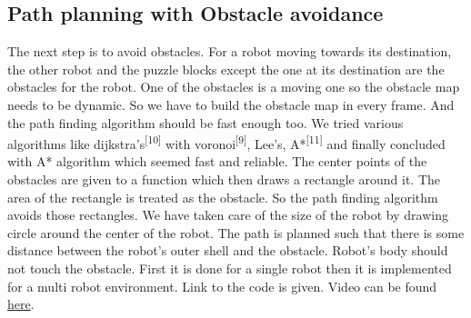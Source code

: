 \documentclass[a4paper,12pt,oneside]{book}
\begin{document}
\subsection*{Path planning with Obstacle avoidance}
The next step is to avoid obstacles. For a robot moving towards its destination, the other robot and the puzzle blocks except the one at its destination are the obstacles for the robot. One of the obstacles is a moving one so the obstacle map needs to be dynamic. So we have to build the obstacle map in every frame. And the path finding algorithm should be fast enough too. We tried various algorithms like dijkstra's\textsuperscript{[10]} with voronoi\textsuperscript{[9]}, Lee's, A*\textsuperscript{[11]} and finally concluded with A* algorithm which seemed fast and reliable. The center points of the obstacles are given to a function which then draws a rectangle around it. The area of the rectangle is treated as the obstacle. So the path finding algorithm avoids those rectangles. We have taken care of the size of the robot by drawing circle around the center of the robot. The path is planned such that there is some distance between the robot's outer shell and the obstacle. Robot's body should not touch the obstacle. First it is done for a single robot then it is implemented for a multi robot environment. Link to the code is given. Video can be found \href{}{here}.
\end{document}
